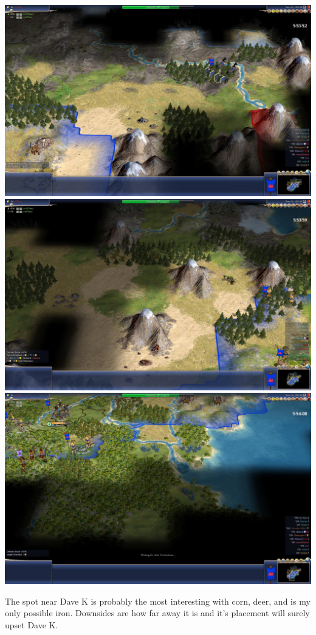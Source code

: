 \documentclass[10pt]{article}
\begin{document}
\includegraphics[width=1.0\textwidth]{turn80-1}
\includegraphics[width=1.0\textwidth]{turn80-2}
\includegraphics[width=1.0\textwidth]{turn80-3}

The spot near Dave K is probably the most interesting with corn, deer,
and is my only possible iron. Downsides are how far away it is and
it's placement will surely upset Dave K.
\end{document}
